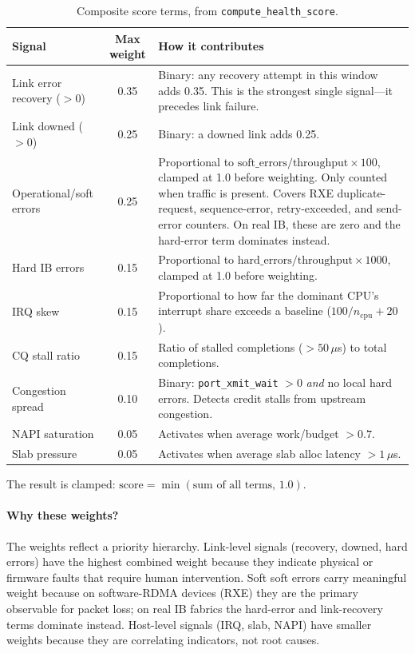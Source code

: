\documentclass[11pt]{article}
\begin{document}
\begin{table}[h]
\centering
\small
\begin{tabularx}{\textwidth}{p{4cm}cX}
\toprule
Signal & Max weight & How it contributes \\
\midrule
Link error recovery ($>0$) & 0.35 & Binary: any recovery attempt in this window adds 0.35. This is the strongest single signal---it precedes link failure. \\[3pt]
Link downed ($>0$) & 0.25 & Binary: a downed link adds 0.25. \\[3pt]
Operational/soft errors & 0.25 & Proportional to $\text{soft\_errors}/\text{throughput} \times 100$, clamped at 1.0 before weighting. Only counted when traffic is present. Covers RXE duplicate-request, sequence-error, retry-exceeded, and send-error counters. On real IB, these are zero and the hard-error term dominates instead. \\[3pt]
Hard IB errors & 0.15 & Proportional to $\text{hard\_errors}/\text{throughput} \times 1000$, clamped at 1.0 before weighting. \\[3pt]
IRQ skew & 0.15 & Proportional to how far the dominant CPU's interrupt share exceeds a baseline ($100/n_{\text{cpu}} + 20$). \\[3pt]
CQ stall ratio & 0.15 & Ratio of stalled completions ($>50\,\mu$s) to total completions. \\[3pt]
Congestion spread & 0.10 & Binary: \texttt{port\_xmit\_wait} $>0$ \emph{and} no local hard errors. Detects credit stalls from upstream congestion. \\[3pt]
NAPI saturation & 0.05 & Activates when average work/budget $> 0.7$. \\[3pt]
Slab pressure & 0.05 & Activates when average slab alloc latency $>1\,\mu$s. \\
\bottomrule
\end{tabularx}
\caption{Composite score terms, from \texttt{compute\_health\_score}.}
\label{tab:score-terms}
\end{table}

The result is clamped: $\text{score} = \min(\text{sum of all terms},\, 1.0)$.

\paragraph{Why these weights?}
The weights reflect a priority hierarchy. Link-level signals
(recovery, downed, hard errors) have the highest combined weight because they
indicate physical or firmware faults that require human intervention. Soft
soft errors carry meaningful weight because on software-RDMA devices (RXE) they
are the primary observable for packet loss; on real IB fabrics the hard-error
and link-recovery terms dominate instead. Host-level signals (IRQ, slab, NAPI) have smaller
weights because they are correlating indicators, not root causes.
\end{document}
